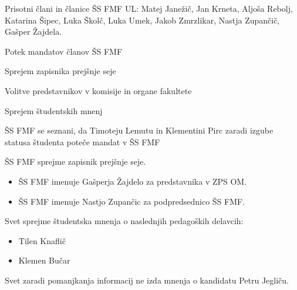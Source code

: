 \documentclass{seja}
\begin{document}
Prisotni člani in članice ŠS FMF UL:
Matej Janežič,
Jan Krneta,
Aljoša Rebolj,
Katarina Šipec,
Luka Školč,
Luka Umek,
Jakob Zmrzlikar,
Nastja Zupančič,
Gašper Žajdela.


\begin{red}
    \item
    Potek mandatov članov ŠS FMF
	\item
	Sprejem zapisnika prejšnje seje
	\item
	Volitve predstavnikov v komisije in organe fakultete
    \item
    Sprejem študentskih mnenj
\end{red}



\begin{ad}
    \item 
    ŠS FMF se seznani, da Timoteju Lemutu in Klementini Pirc zaradi izgube statusa študenta poteče mandat v ŠS FMF
    \item
    \begin{sklep*}
        ŠS FMF sprejme zapisnik prejšnje seje.
    \end{sklep*}

    \item
    \begin{sklep*}
        \begin{itemize}
        \item ŠS FMF imenuje Gašperja Žajdelo za predstavnika v ZPS OM.
        \item ŠS FMF imenuje Nastjo Zupančic za podpredsednico ŠS FMF. 
        \end{itemize}
    \end{sklep*}
    
    \item 
    \begin{sklep*}
    Svet sprejme študentska mnenja o naslednjih pedagoških delavcih:
        \begin{itemize}
            \item Tilen Knaflič
            \item Klemen Bučar
        \end{itemize}
    Svet zaradi pomanjkanja informacij ne izda mnenja o kandidatu Petru Jegliču.
    \end{sklep*}
    
\end{ad}
\end{document}
